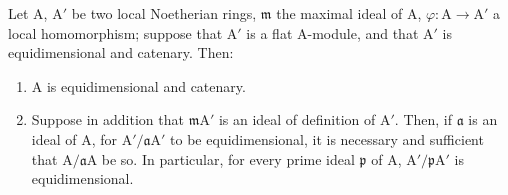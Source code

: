 \begin{proposition}[7.1.3]
\label{IV.7.1.3}
Let $\mathrm{A}$, $\mathrm{A}'$ be two local Noetherian rings, $\mathfrak{m}$ the maximal ideal of $\mathrm{A}$, $\varphi:\mathrm{A}\to\mathrm{A}'$ a local homomorphism; suppose that $\mathrm{A}'$ is a flat $\mathrm{A}$-module, and that $\mathrm{A}'$ is equidimensional and catenary.
Then:
\begin{enumerate}[label=\emph{\roman*)}]
  \item $\mathrm{A}$ is equidimensional and catenary.
  \item Suppose in addition that $\mathfrak{m}\mathrm{A}'$ is an ideal of definition of $\mathrm{A}'$.
  Then, if $\mathfrak{a}$ is an ideal of $\mathrm{A}$, for $\mathrm{A}'/\mathfrak{a}\mathrm{A}'$ to be equidimensional, it is necessary and sufficient that $\mathrm{A}/\mathfrak{a}\mathrm{A}$ be so.
  In particular, for every prime ideal $\mathfrak{p}$ of $\mathrm{A}$, $\mathrm{A}'/\mathfrak{p}\mathrm{A}'$ is equidimensional.
\end{enumerate}
\end{proposition}

